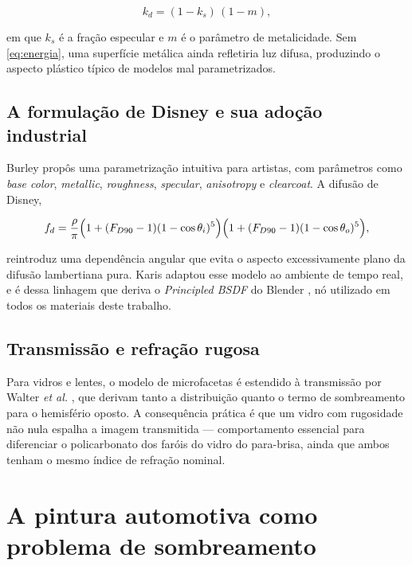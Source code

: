 \begin{equation}
k_d = (1 - k_s)\,(1 - m),
\label{eq:energia}
\end{equation}

\noindent em que $k_s$ \'e a fra\c{c}\~ao especular e $m$ \'e o par\^ametro de metalicidade. Sem
\eqref{eq:energia}, uma superf\'icie met\'alica ainda refletiria luz difusa, produzindo o
aspecto pl\'astico t\'ipico de modelos mal parametrizados.

\subsection{A formula\c{c}\~ao de Disney e sua ado\c{c}\~ao industrial}

Burley \cite{burley2012} prop\^os uma parametriza\c{c}\~ao intuitiva para artistas, com
par\^ametros como \emph{base color}, \emph{metallic}, \emph{roughness}, \emph{specular},
\emph{anisotropy} e \emph{clearcoat}. A difus\~ao de Disney,

\begin{equation}
f_d = \frac{\rho}{\pi}\Bigl(1 + (F_{D90}-1)(1-\cos\theta_i)^5\Bigr)\Bigl(1 + (F_{D90}-1)(1-\cos\theta_o)^5\Bigr),
\label{eq:disney-diffuse}
\end{equation}

\noindent reintroduz uma depend\^encia angular que evita o aspecto excessivamente plano da
difus\~ao lambertiana pura. Karis \cite{karis2013} adaptou esse modelo ao ambiente de tempo
real, e \'e dessa linhagem que deriva o \emph{Principled BSDF} do Blender
\cite{blender5manual}, n\'o utilizado em todos os materiais deste trabalho.

\subsection{Transmiss\~ao e refra\c{c}\~ao rugosa}

Para vidros e lentes, o modelo de microfacetas \'e estendido \`a transmiss\~ao por Walter
\emph{et al.} \cite{walter2007}, que derivam tanto a distribui\c{c}\~ao quanto o termo de
sombreamento para o hemisf\'erio oposto. A consequ\^encia pr\'atica \'e que um vidro com
rugosidade n\~ao nula espalha a imagem transmitida --- comportamento essencial para diferenciar
o policarbonato dos far\'ois do vidro do para-brisa, ainda que ambos tenham o mesmo \'indice de
refra\c{c}\~ao nominal.

\section{A pintura automotiva como problema de sombreamento}

